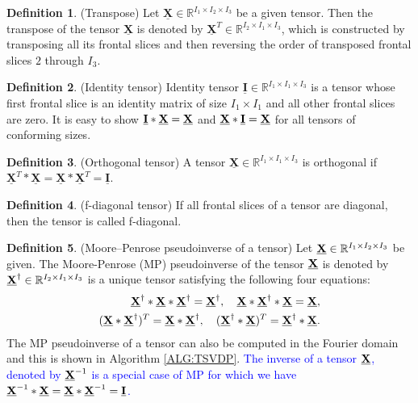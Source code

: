\documentclass[preprint,12pt]{elsarticle}
\theoremstyle{definition}
\newtheorem{defn}{Definition}
\newcommand{\cX}{\underline{\bf X}}
\newcommand{\X}{{\bf X}}
\newcommand{\I}{{\bf I}}
\begin{document}
\begin{defn} {\rm ({Transpose})
Let $\underline{\mathbf X}\in\mathbb{R}^{I_1\times I_2\times I_3}$ be a given tensor. Then the transpose of the tensor $\underline{\mathbf X}$ is denoted by $\underline{\mathbf X}^{T}\in\mathbb{R}^{I_2\times I_1\times I_3}$, which is constructed by transposing all its frontal slices and then reversing the order of transposed frontal
slices $2$ through $I_3$.}
\end{defn}

\begin{defn} ({Identity tensor})
Identity tensor $\underline{\mathbf I}\in\mathbb{R}^{I_1\times I_1\times I_3}$ is a tensor whose first frontal slice is an identity matrix of size $I_1\times I_1$ and all other frontal slices are zero. It is easy to show $\underline{\I}*\underline{\X}=\underline{\X}$ and $\underline{\X}*\underline{\I} =\underline{\X}$ for all tensors of conforming sizes.
\end{defn}
\begin{defn} ({Orthogonal tensor})
A tensor $\underline{\mathbf X}\in\mathbb{R}^{I_1\times I_1\times I_3}$ is orthogonal if ${\underline{\mathbf X}^T} * \underline{\mathbf X} = \underline{\mathbf X} * {\underline{\mathbf X}^ T} = \underline{\mathbf I}$.
\end{defn}

\begin{defn} ({f-diagonal tensor})
If all frontal slices of a tensor are diagonal, then the tensor is called f-diagonal.
\end{defn}

\begin{defn}
(Moore–Penrose pseudoinverse of a tensor) Let $\cX\in\mathbb{R}^{I_1\times I_2\times I_3}$ be given. The Moore-Penrose (MP) pseudoinverse of the tensor $\cX$ is denoted by $\cX^{\dag}\in\mathbb{R}^{I_2\times I_1\times I_3}$ is a unique tensor satisfying the following four equations:
\begin{eqnarray*}
\cX^{\dag}*\cX*\cX^{\dag}=\cX^{\dag},\quad \cX*\cX^{\dag}*\cX=\cX,\\
(\cX*\cX^{\dag})^T=\cX*\cX^{\dag},\quad (\cX^{\dag}*\cX)^T=\cX^{\dag}*\cX.
\end{eqnarray*}
The MP pseudoinverse of a tensor can also be computed in the Fourier domain and this is shown in Algorithm \ref{ALG:TSVDP}. \textcolor{blue}{The inverse of a tensor $\cX$, denoted by $\cX^{-1}$ is a special case of MP for which we have $\cX^{-1}*\cX=\cX*\cX^{-1}=\underline{\bf I}$.}
\end{defn}
\end{document}
